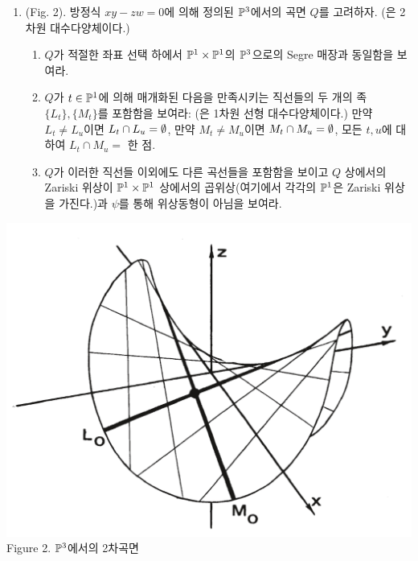 \begin{enumerate}[label=\tb{2.\arabic*.},itemindent=0mm,itemsep=4mm]
		[Hint: $\mb P^N$의 동차 좌표가 $\sx{z_{ij}}{i=0,\ldots,r,j=0,\ldots,s}$라 하고
		$\mf a$가 $z_{ij}$를 $x_iy_j$로 대응시키는 준동형사상 $k[\{z_{ij}\}]\ra k[x_0,\ldots,x_r,y_0,\ldots,y_s]$의 핵이라 하자.
		그 후 $\Im\psi=Z(\mf a)$임을 보여라]\\
		\sol $f\in\mf a$ iff $f(x_0y_0,\ldots,x_ry_s)=0$이므로 (Ex. 2.12b)에서와 같은 논의에 의해 $\Im\psi=Z(\mf a)$이다.
		($\mf a$는 $z_{ij}z_{kl}-z_{kj}z_{il}$들에 의해 생성된다.)
		\item {} (Fig. 2). 방정식 $xy-zw=0$에 의해 정의된 $\mathbb{P}^3$에서의 곡면 $Q$를 고려하자.
		(은 2차원 대수다양체이다.)
		\begin{enumerate}[label=(\alph*)]
			\item $Q$가 적절한 좌표 선택 하에서 $\mathbb{P}^1\times\mathbb{P}^1$의 $\mathbb{P}^3$으로의 Segre 매장과 동일함을 보여라.
			\item $Q$가 $t\in\mathbb{P}^1$에 의해 매개화된 다음을 만족시키는 직선들의 두 개의 족 $\{L_t\},\{M_t\}$를 포함함을 보여라:
			(은 1차원 선형 대수다양체이다.)
			만약 $L_t\ne L_u$이면 $L_t\cap L_u=\emptyset$, 만약 $M_t\ne M_u$이면 $M_t\cap M_u=\emptyset$,
			모든 $t,u$에 대하여 $L_t\cap M_u=$ 한 점.
			\item $Q$가 이러한 직선들 이외에도 다른 곡선들을 포함함을 보이고 $Q$ 상에서의 Zariski 위상이
			$\mathbb{P}^1\times\mathbb{P}^1$ 상에서의 곱위상(여기에서 각각의 $\mathbb{P}^1$은 Zariski 위상을 가진다.)과
			$\psi$를 통해 위상동형이 아님을 보여라.
		\end{enumerate}
		\end{enumerate}
		\begin{center}
			\includegraphics[width=0.5\columnwidth]{Figure2}\\
			Figure 2. $\mathbb{P}^3$에서의 2차곡면
		\end{center}
